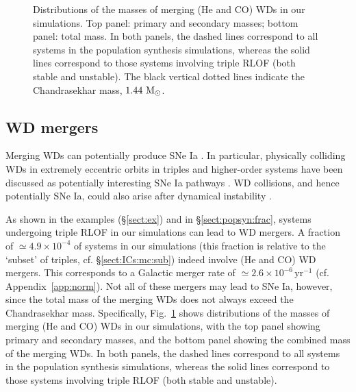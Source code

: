 \documentclass[twocolumn,appendixfloats,tighten]{aastex631}
\def\msun{{\rm\,M_\odot}}
\newcommand{\F}{Fig.}
\newcommand{\yr}{\mathrm{yr}}
\begin{document}
\begin{figure}
\iftoggle{ApJFigs}{
\texttt{[image: merging\_WD\_masses\_ind]}
\texttt{[image: merging\_WD\_masses\_tot]}
}{
\texttt{[image: figs/merging\_WD\_masses\_ind]}
\texttt{[image: figs/merging\_WD\_masses\_tot]}
}
\caption{Distributions of the masses of merging (He and CO) WDs in our simulations. Top panel: primary and secondary masses; bottom panel: total mass. In both panels, the dashed lines correspond to all systems in the population synthesis simulations, whereas the solid lines correspond to those systems involving triple RLOF (both stable and unstable). The black vertical dotted lines indicate the Chandrasekhar mass, $1.44\,\msun$.}
\label{fig:WD_masses}
\end{figure}

\subsection{WD mergers}
\label{sect:dis:WD}
Merging WDs can potentially produce SNe Ia \citep[e.g.,][]{2009ApJ...705L.128R,2010MNRAS.406.2749L,2011A&A...528A.117P,2016ApJ...822...19P}. In particular, physically colliding WDs in extremely eccentric orbits in triples and higher-order systems have been discussed as potentially interesting SNe Ia pathways \citep[e.g.,][]{2011ApJ...741...82T,2012arXiv1211.4584K,2013MNRAS.430.2262H,2013ApJ...778L..37K,2018A&A...610A..22T,2018MNRAS.476.4234F,2018MNRAS.478..620H,2019ApJ...882...24H}. WD collisions, and hence potentially SNe Ia, could also arise after dynamical instability \citep[e.g.,][]{2012ApJ...760...99P,2021arXiv210713620H,2021arXiv210804272T}. 

As shown in the examples (\S\ref{sect:ex}) and in \S\ref{sect:popsyn:frac}, systems undergoing triple RLOF in our simulations can lead to WD mergers. A fraction of $\simeq 4.9 \times 10^{-4}$ of systems in our simulations (this fraction is relative to the `subset' of triples, cf. \S\ref{sect:ICs:mc:sub}) indeed involve (He and CO) WD mergers. This corresponds to a Galactic merger rate of $\simeq 2.6 \times 10^{-6} \, \yr^{-1}$ (cf. Appendix~\ref{app:norm}). Not all of these mergers may lead to SNe Ia, however, since the total mass of the merging WDs does not always exceed the Chandrasekhar mass. Specifically, \F~\ref{fig:WD_masses} shows distributions of the masses of merging (He and CO) WDs in our simulations, with the top panel showing primary and secondary masses, and the bottom panel showing the combined mass of the merging WDs. In both panels, the dashed lines correspond to all systems in the population synthesis simulations, whereas the solid lines correspond to those systems involving triple RLOF (both stable and unstable). 
\end{document}

